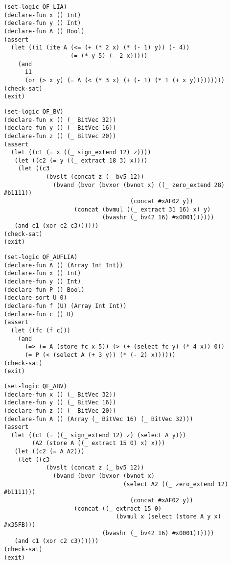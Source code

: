 \documentclass[12pt]{article}
\begin{document}

{\footnotesize
\begin{verbatim}
(set-logic QF_LIA)
(declare-fun x () Int)
(declare-fun y () Int)
(declare-fun A () Bool)
(assert
  (let ((i1 (ite A (<= (+ (* 2 x) (* (- 1) y)) (- 4))
                   (= (* y 5) (- 2 x)))))
    (and
      i1
      (or (> x y) (= A (< (* 3 x) (+ (- 1) (* 1 (+ x y)))))))))
(check-sat)
(exit)
\end{verbatim}}



{\footnotesize
\begin{verbatim}
(set-logic QF_BV)
(declare-fun x () (_ BitVec 32))
(declare-fun y () (_ BitVec 16))
(declare-fun z () (_ BitVec 20))
(assert
  (let ((c1 (= x ((_ sign_extend 12) z))))
   (let ((c2 (= y ((_ extract 18 3) x))))
    (let ((c3 
            (bvslt (concat z (_ bv5 12)) 
              (bvand (bvor (bvxor (bvnot x) ((_ zero_extend 28) #b1111)) 
                                    (concat #xAF02 y))
                    (concat (bvmul ((_ extract 31 16) x) y) 
                            (bvashr (_ bv42 16) #x0001))))))
   (and c1 (xor c2 c3))))))
(check-sat)
(exit)
\end{verbatim}}



{\footnotesize
\begin{verbatim}
(set-logic QF_AUFLIA)
(declare-fun A () (Array Int Int))
(declare-fun x () Int)
(declare-fun y () Int)
(declare-fun P () Bool)
(declare-sort U 0)
(declare-fun f (U) (Array Int Int))
(declare-fun c () U)
(assert
  (let ((fc (f c)))
    (and
      (=> (= A (store fc x 5)) (> (+ (select fc y) (* 4 x)) 0))
      (= P (< (select A (+ 3 y)) (* (- 2) x))))))
(check-sat)
(exit)
\end{verbatim}}



\footnotesize
\begin{verbatim}
(set-logic QF_ABV)
(declare-fun x () (_ BitVec 32))
(declare-fun y () (_ BitVec 16))
(declare-fun z () (_ BitVec 20))
(declare-fun A () (Array (_ BitVec 16) (_ BitVec 32)))
(assert
  (let ((c1 (= ((_ sign_extend 12) z) (select A y)))
        (A2 (store A ((_ extract 15 0) x) x)))
   (let ((c2 (= A A2)))
    (let ((c3 
            (bvslt (concat z (_ bv5 12)) 
              (bvand (bvor (bvxor (bvnot x) 
                                  (select A2 ((_ zero_extend 12) #b1111)))
                                    (concat #xAF02 y))
                    (concat ((_ extract 15 0) 
                                (bvmul x (select (store A y x) #x35FB))) 
                            (bvashr (_ bv42 16) #x0001))))))
   (and c1 (xor c2 c3))))))
(check-sat)
(exit)
\end{verbatim}
\end{document}
